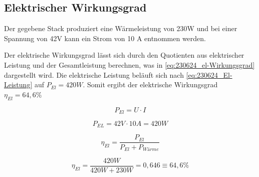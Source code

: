 \subsection{Elektrischer Wirkungsgrad}

Der gegebene Stack produziert eine Wärmeleistung von 230W und bei einer Spannung von 42V kann ein Strom von 10 A entnommen werden.

Der elektrische Wirkungsgrad lässt sich durch den Quotienten aus elektrischer Leistung und der Gesamtleistung berechnen, was in \autoref{eq:230624_el-Wirkungsgrad} dargestellt wird. 
Die elektrische Leistung beläuft sich nach \autoref{eq:230624_El-Leistung} auf $P_{El} = 420W$. Somit ergibt der elektrische Wirkungsgrad $\eta_{El} = 64,6\%$

\begin{equation}
    P_{El} = U \cdot I
    \label{eq:230624_El-Leistung}
\end{equation}

$$P_{EL} = 42V \cdot 10A = 420W$$

\begin{equation}
    \eta_{El} = \frac{P_{El}}{P_{El} + P_{Wärme}} 
    \label{eq:230624_el-Wirkungsgrad}
\end{equation}

$$\eta_{El}= \frac{420 W}{420 W + 230 W} = 0,646 \equiv 64,6 \%$$